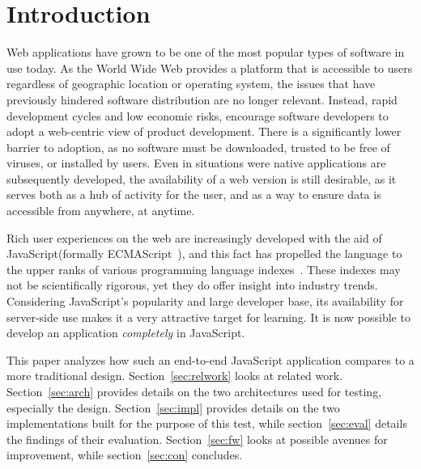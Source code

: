 \section{\label{sec:intro}Introduction}

Web applications have grown to be one of the most popular types of software in use today. As the World Wide Web provides a platform that is accessible to users regardless of geographic location or operating system, the issues that have previously hindered software distribution are no longer relevant. Instead, rapid development cycles and low economic risks, encourage software developers to adopt a web-centric view of product development. There is a significantly lower barrier to adoption, as no software must be downloaded, trusted to be free of viruses, or installed by users. Even in situations were native applications are subsequently developed, the availability of a web version is still desirable, as it serves both as a hub of activity for the user, and as a way to ensure data is accessible from anywhere, at anytime.

Rich user experiences on the web are increasingly developed with the aid of JavaScript(formally ECMAScript~\cite{ecmascriptiso}), and this fact has propelled the language to the upper ranks of various programming language indexes~\cite{ghstats}\cite{tlpi}\cite{tiobe}. These indexes may not be scientifically rigorous, yet they do offer insight into industry trends. Considering JavaScript's popularity and large developer base, its availability for server-side use makes it a very attractive target for learning. It is now possible to develop an application \emph{completely} in JavaScript.

This paper analyzes how such an end-to-end JavaScript application compares to a more traditional design. Section~\ref{sec:relwork} looks at related work. Section~\ref{sec:arch} provides details on the two architectures used for testing, especially the design. Section~\ref{sec:impl} provides details on the two implementations built for the purpose of this test, while section~\ref{sec:eval} details the findings of their evaluation. Section~\ref{sec:fw} looks at possible avenues for improvement, while section~\ref{sec:con} concludes.
